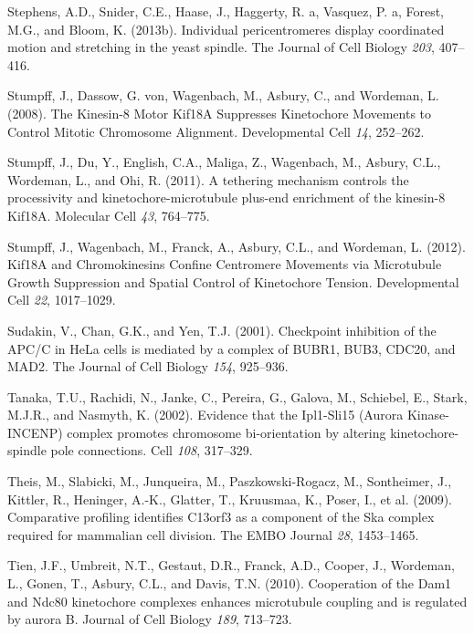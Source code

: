 \documentclass[12pt,a4paper,twoside,openright]{book}
\begin{document}
\hypertarget{ref-Stephens2013a}{}
Stephens, A.D., Snider, C.E., Haase, J., Haggerty, R. a, Vasquez, P. a,
Forest, M.G., and Bloom, K. (2013b). Individual pericentromeres display
coordinated motion and stretching in the yeast spindle. The Journal of
Cell Biology \emph{203}, 407--416.

\hypertarget{ref-Stumpff2008}{}
Stumpff, J., Dassow, G. von, Wagenbach, M., Asbury, C., and Wordeman, L.
(2008). The Kinesin-8 Motor Kif18A Suppresses Kinetochore Movements to
Control Mitotic Chromosome Alignment. Developmental Cell \emph{14},
252--262.

\hypertarget{ref-Stumpff2011a}{}
Stumpff, J., Du, Y., English, C.A., Maliga, Z., Wagenbach, M., Asbury,
C.L., Wordeman, L., and Ohi, R. (2011). A tethering mechanism controls
the processivity and kinetochore-microtubule plus-end enrichment of the
kinesin-8 Kif18A. Molecular Cell \emph{43}, 764--775.

\hypertarget{ref-Stumpff2012}{}
Stumpff, J., Wagenbach, M., Franck, A., Asbury, C.L., and Wordeman, L.
(2012). Kif18A and Chromokinesins Confine Centromere Movements via
Microtubule Growth Suppression and Spatial Control of Kinetochore
Tension. Developmental Cell \emph{22}, 1017--1029.

\hypertarget{ref-Sudakin2001}{}
Sudakin, V., Chan, G.K., and Yen, T.J. (2001). Checkpoint inhibition of
the APC/C in HeLa cells is mediated by a complex of BUBR1, BUB3, CDC20,
and MAD2. The Journal of Cell Biology \emph{154}, 925--936.

\hypertarget{ref-Tanaka2002}{}
Tanaka, T.U., Rachidi, N., Janke, C., Pereira, G., Galova, M., Schiebel,
E., Stark, M.J.R., and Nasmyth, K. (2002). Evidence that the Ipl1-Sli15
(Aurora Kinase-INCENP) complex promotes chromosome bi-orientation by
altering kinetochore-spindle pole connections. Cell \emph{108},
317--329.

\hypertarget{ref-Theis2009}{}
Theis, M., Slabicki, M., Junqueira, M., Paszkowski-Rogacz, M.,
Sontheimer, J., Kittler, R., Heninger, A.-K., Glatter, T., Kruusmaa, K.,
Poser, I., et al. (2009). Comparative profiling identifies C13orf3 as a
component of the Ska complex required for mammalian cell division. The
EMBO Journal \emph{28}, 1453--1465.

\hypertarget{ref-Tien2010}{}
Tien, J.F., Umbreit, N.T., Gestaut, D.R., Franck, A.D., Cooper, J.,
Wordeman, L., Gonen, T., Asbury, C.L., and Davis, T.N. (2010).
Cooperation of the Dam1 and Ndc80 kinetochore complexes enhances
microtubule coupling and is regulated by aurora B. Journal of Cell
Biology \emph{189}, 713--723.
\end{document}
